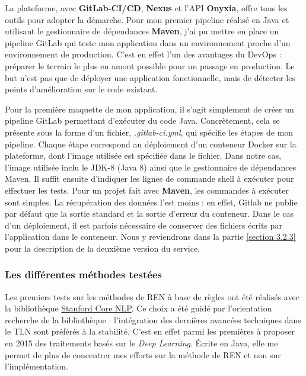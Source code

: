 La plateforme, avec \textbf{GitLab-CI/CD}, \textbf{Nexus} et l'API \textbf{Onyxia}, offre tous les outils pour adopter la démarche. Pour mon premier pipeline réalisé en Java et utilisant le gestionnaire de dépendances \textbf{Maven}, j'ai pu mettre en place un pipeline GitLab qui teste mon application dans un environnement proche d'un environnement de production. C'est en effet l'un des avantages du DevOps : préparer le terrain le plus en amont possible pour un passage en production. Le but n'est pas que de déployer une application fonctionnelle, mais de détecter les points d'amélioration sur le code existant. 
\newline

Pour la première maquette de mon application, il s'agit simplement de créer un pipeline GitLab permettant d'exécuter du code Java. Concrètement, cela se présente sous la forme d'un fichier, \textit{.gitlab-ci.yml}, qui spécifie les étapes de mon pipeline. Chaque étape correspond au déploiement d'un conteneur Docker sur la plateforme, dont l'image utilisée est spécifiée dans le fichier. Dans notre cas, l'image utilisée inclu le JDK-8 (Java 8) ainsi que le gestionnaire de dépendances Maven. Il suffit ensuite d'indiquer les lignes de commande shell à exécuter pour effectuer les tests. Pour un projet fait avec \textbf{Maven}, les commandes à exécuter sont simples. La récupération des données l'est moins : en effet, Gitlab ne publie par défaut que la sortie standard et la sortie d'erreur du conteneur. Dans le cas d'un déploiement, il est parfois nécessaire de conserver des fichiers écrits par l'application dans le conteneur. Nous y reviendrons dans la partie \ref{section 3.2.3} pour la description de la deuxième version du service.
\label{section 2.2.3}

\subsubsection{Les différentes méthodes testées}
Les premiers tests sur les méthodes de REN à base de règles ont été réalisés avec la bibliothèque \href{https://stanfordnlp.github.io/CoreNLP/}{Stanford Core NLP}. Ce choix a été guidé par l'orientation recherche de la bibliothèque : l'intégration des dernières avancées techniques dans le TLN sont préférés à la stabilité. C'est en effet parmi les premières à proposer en 2015 des traitements basés sur le \textit{Deep Learning}. Écrite en Java, elle me permet de plus de concentrer mes efforts sur la méthode de REN et non sur l'implémentation. 
\newline


